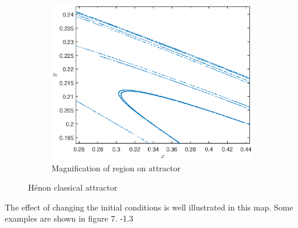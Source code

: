 \documentclass[a4paper]{article}
\begin{document}
\begin{figure}[h]
\begin{subfigure}[b]{0.45\textwidth}
        \includegraphics[width=\textwidth]{henoncloseup}
        \caption{Magnification of region on attractor}
        \label{fig:mouse}
    \end{subfigure}
    \caption{H{\'e}non classical attractor}\label{fig:animals}
\end{figure} 
The effect of changing the initial conditions is well illustrated in this map. Some examples are shown in figure 7.  
-1.3
\end{document}
